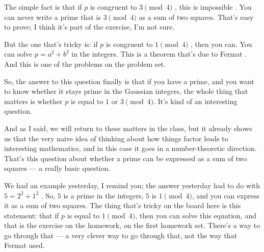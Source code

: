\begin{speech}[00:06:08 - 00:08:12]
The simple fact is that if $p$ is congruent to $3 \pmod 4$ , this is impossible . You can never write a prime that is $3 \pmod 4$ as a sum of two squares. That's easy to prove; I think it's part of the exercise, I'm not sure.

But the one that's tricky is: if $p$ is congruent to $1 \pmod 4$ , then you can. You can solve  $p = a^2 + b^2$  in the integers. This is a theorem that's due to Fermat . And this is one of the problems on the problem set.

So, the answer to this question finally is that if you have a prime, and you want to know whether it stays prime in the Gaussian integers, the whole thing that matters is whether $p$ is equal to $1$ or $3 \pmod 4$. It's kind of an interesting question.

And as I said, we will return to these matters in the class, but it already shows us that the very naive idea of thinking about how things factor leads to interesting mathematics, and in this case it goes in a number-theoretic direction. That's this question about whether a prime can be expressed as a sum of two squares --- a really basic question.

We had an example yesterday, I remind you; the answer yesterday had to do with $5 = 2^2 + 1^2$ . So, $5$ is a prime in the integers, $5$ is $1 \pmod 4$, and you can express it as a sum of two squares. The thing that's tricky on the board here is this statement: that if $p$ is equal to $1 \pmod 4$, then you can solve this equation, and that is the exercise on the homework, on the first homework set. There's a way to go through that --- a very clever way to go through that, not the way that Fermat used.
\end{speech}

